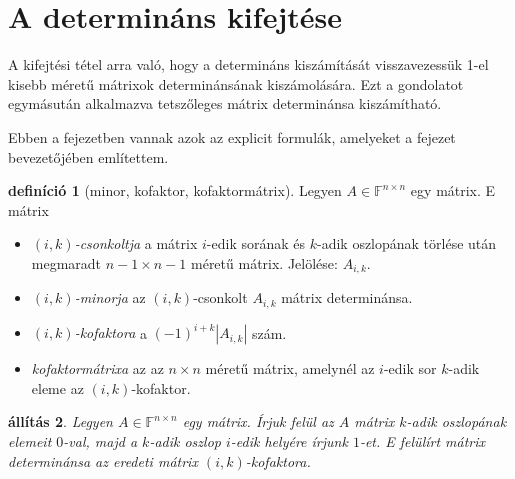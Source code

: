 \documentclass[9pt, a4paper, showtrims]{memoir}
\theoremstyle{plain}
\newtheorem{proposition}{állítás}[chapter]
\theoremstyle{remark}
\theoremstyle{definition}
\newtheorem{definition}[proposition]{definíció}
\begin{document}
\section{A determináns kifejtése}
A kifejtési tétel arra való,
hogy a determináns kiszámítását visszavezessük 1-el kisebb méretű mátrixok determinánsának kiszámolására.
Ezt a gondolatot egymásután alkalmazva tetszőleges mátrix determinánsa kiszámítható.

Ebben a fejezetben vannak azok az explicit formulák,
amelyeket a fejezet bevezetőjében említettem.
\begin{definition}[minor, kofaktor, kofaktormátrix]
	Legyen $A\in\mathbb{F}^{n\times n}$ egy mátrix.
	E mátrix
	\begin{itemize}
		\item\emph{$\left( i,k \right)$-csonkoltja}
		      a mátrix $i$-edik sorának és $k$-adik oszlopának törlése után megmaradt
		      $n-1\times n-1$ méretű mátrix. Jelölése: $A_{i,k}$.
		\item\emph{$\left( i,k \right)$-minorja}
		      az $(i,k)$-csonkolt $A_{i,k}$ mátrix determinánsa.
		\item\emph{$\left( i,k \right)$-kofaktora}
		      a $\left( -1 \right)^{i+k}|A_{i,k}|$ szám.
		\item\emph{kofaktormátrixa}
		      az az $n\times n$ méretű mátrix,
		      amelynél az $i$-edik sor $k$-adik eleme az $\left( i,k \right)$-kofaktor.\qedhere
	\end{itemize}
\end{definition}
\begin{proposition}
	Legyen $A\in\mathbb{F}^{n\times n}$ egy mátrix.
	Írjuk felül az $A$ mátrix $k$-adik oszlopának elemeit $0$-val,
	majd a $k$-adik oszlop $i$-edik helyére írjunk $1$-et.
	E felülírt mátrix determinánsa az eredeti mátrix $\left( i,k \right)$-kofaktora.
\end{proposition}
\end{document}
